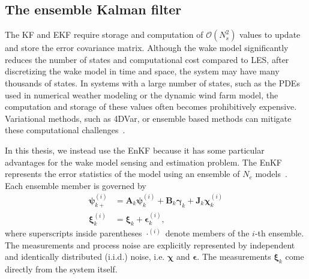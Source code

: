\subsection{The ensemble Kalman filter}
\label{subsec:estimation-ensemble-enkf}
The KF and EKF require  storage and computation of $\mathcal{O}(N_s^2)$ values to update and store the error covariance matrix. Although the wake model significantly reduces the number of states and computational cost compared to LES, after discretizing the wake model in time and space, the system may have many thousands of states. In systems with a large number of states, such as the PDEs used in numerical weather modeling or the dynamic wind farm model, the computation and storage of these values often becomes prohibitively expensive. Variational methods, such as 4DVar, or ensemble based methods can mitigate these computational challenges~\cite{Evensen2003a, Kalnay2003a}. 


In this thesis, we instead use the EnKF because it has some particular advantages for the wake model sensing and estimation problem. The EnKF represents the error statistics of the model using an ensemble of $N_e$ models~\cite{Evensen2003a}. Each ensemble member is  governed by
\begin{align}
\label{eq:linear_enkf_forecast1}
\boldsymbol{\psi}_{k+}^{(i)} &= \mathbf{A}_k \boldsymbol{\psi}_k^{(i)} + \mathbf{B}_k \boldsymbol{\gamma}_k + \mathbf{J}_k\boldsymbol{\chi}_k^{(i)} \\
\label{eq:linear_enkf_forecast2}
\boldsymbol{\xi}_k^{(i)} &= \boldsymbol{\xi}_k + \boldsymbol{\epsilon}_k^{(i)},
\end{align}
where superscripts inside parentheses $\cdot^{(i)}$ denote members of the $i$-th ensemble. The measurements and process noise are explicitly represented by independent and identically distributed (i.i.d.) noise, i.e. $\boldsymbol \chi$ and $\boldsymbol \epsilon$.  The measurements $\boldsymbol{\xi}_k$ come directly from the system itself. 

